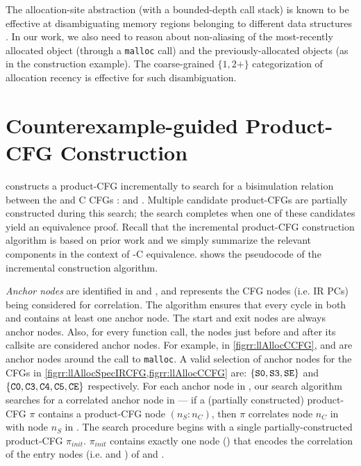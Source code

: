 The allocation-site abstraction (with a bounded-depth call stack) is
known to be effective at disambiguating memory regions belonging to
different data structures
\cite{allocationSiteAbstraction82,allocationSiteAbstraction90,allocationSiteAbstraction06}.
In our work, we also need to reason about non-aliasing
of the most-recently allocated object (through a {\tt malloc} call) and
the previously-allocated objects (as in the 
construction example). The coarse-grained $\{1, 2+\}$
categorization of allocation recency is effective for such disambiguation.

\section{Counterexample-guided Product-CFG Construction}
\label{sec:searchalgo}
\toolName{} constructs a product-CFG incrementally to search for a bisimulation relation
between the \SpecL{} and C CFGs : \sprog{} and \cprog{}.
Multiple candidate product-CFGs are partially constructed during this search;
the search completes when one of these candidates yield an equivalence proof.
Recall that the incremental product-CFG construction algorithm is based on prior work \cite{shubhanipdhthesis}
and we simply summarize the relevant components in the context of \SpecL{}-C equivalence.
 shows the pseudocode of the incremental construction algorithm.

{\em Anchor nodes} are identified in \sprog{} and \cprog{}, and represents the
CFG nodes (i.e. IR PCs) being considered for correlation.
The algorithm ensures that every cycle in both \sprog{} and \cprog{} contains at least one anchor node.
The start and exit nodes are always anchor nodes.
Also, for every function call, the nodes just before and after its callsite are considered anchor nodes.
For example, in \cref{figrr:llAllocCCFG},  and  are anchor nodes around the call to {\tt malloc}.
A valid selection of anchor nodes for the CFGs in \cref{figrr:llAllocSpecIRCFG,figrr:llAllocCCFG} are:
$\{ {\tt S0},{\tt S3},{\tt SE} \}$ and $\{ {\tt C0}, {\tt C3}, {\tt C4}, {\tt C5}, {\tt CE} \}$ respectively.
For each anchor node in \cprog{}, our search algorithm searches for a correlated anchor node in \sprog{} --- if
a (partially constructed) product-CFG $\pi$ contains a product-CFG node  $(n_S\!:\!n_C)$, then $\pi$
correlates node $n_C$ in \cprog{} with node $n_S$ in \sprog{}.
The search procedure begins with a single partially-constructed product-CFG $\pi_{init}$.
$\pi_{init}$ contains exactly one node () that encodes the correlation of the entry nodes
(i.e.  and ) of \sprog{} and \cprog{}.

